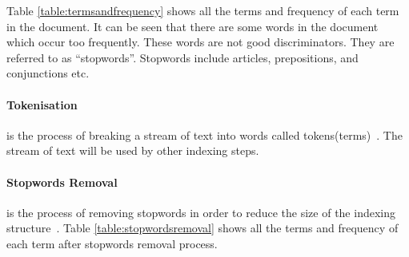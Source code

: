 \begin{table}
\centering
{}
\caption{Terms and Frequency} \label{table:termsandfrequency}
\end{table}

Table \ref{table:termsandfrequency} shows all the terms and frequency of each term in the document. It can be seen that there are some words in the 
document which occur too frequently. These words are not good discriminators. They are referred to as ``stopwords''. Stopwords include
articles, prepositions, and conjunctions etc.

\paragraph{Tokenisation}
is the process of breaking a stream of text into words called tokens(terms)~\cite{tokenization}. The stream of text will be used by other indexing steps.

\paragraph{Stopwords Removal}
is the process of removing stopwords in order to reduce the size of the indexing structure~\cite[P. 15]{IRarchitecture}.
Table \ref{table:stopwordsremoval} shows all the terms and frequency of each term after stopwords removal process.

